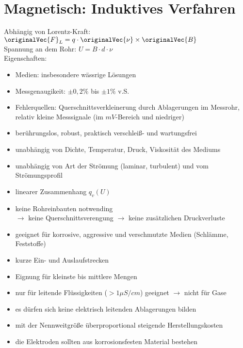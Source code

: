 \documentclass{scrreprt}
\begin{document}
\section{Magnetisch: Induktives Verfahren}
Abhängig von Lorentz-Kraft: $\originalVec{F}_L=q\cdot \originalVec{\nu} \times \originalVec{B}$\\
Spannung an dem Rohr: $U=B\cdot d \cdot \nu$\\
Eigenschaften:
\begin{itemize}
\item Medien: insbesondere wässrige Lösungen
\item Messgenaugikeit: $\pm 0,2\%$ bis $\pm 1\%$ v.S.
\item Fehlerquellen: Querschnittsverkleinerung durch Ablagerungen im Messrohr, relativ kleine Messsignale (im $\unit{mV}$-Bereich und niedriger)
\end{itemize}
\begin{itemize}[label=$+$]
\item berührungslos, robust, praktisch verschleiß- und wartungsfrei
\item unabhängig von Dichte, Temperatur, Druck, Viskosität des Mediums
\item unabhängig von Art der Strömung (laminar, turbulent) und vom Strömungsprofil
\item linearer Zusammenhang $q_v(U)$
\item keine Rohreinbauten notwending\\
$\to$  keine Querschnittsverengung $\to$ keine zusätzlichen Druckverluste
\item geeignet für korrosive, aggressive und verschmutzte Medien (Schlämme, Feststoffe)
\item kurze Ein- und Auslaufstrecken
\item Eignung für kleinste bis mittlere Mengen
\end{itemize}
\begin{itemize}[label=$-$]
\item nur für leitende Flüssigkeiten ($> 1 \unit{\mu S/cm}$) geeignet $\to$ nicht für Gase
\item es dürfen sich keine elektrisch leitenden Ablagerungen bilden
\item mit der Nennweitgröße überproportional steigende Herstellungskosten
\item die Elektroden sollten aus korrosionsfesten Material bestehen
\end{itemize}
\end{document}
